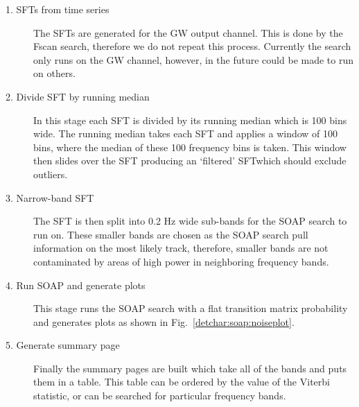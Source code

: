 \begin{description}
	\item[1. \glspl{SFT} from time series] The \glspl{SFT} are generated for the \gls{GW} output channel. This is done by the Fscan search, therefore we do not repeat this process. Currently the search only runs on the \gls{GW} channel, however, in the future could be made to run on others.
	
	\item[2. Divide \gls{SFT} by running median] In this stage each \gls{SFT} is divided by its running median which is 100 bins wide. The running median takes each \gls{SFT} and applies a window of 100 bins, where the median of these 100 frequency bins is taken. This window then slides over the \gls{SFT} producing an `filtered' \gls{SFT}which should exclude outliers.
	
	\item[3. Narrow-band \gls{SFT}] The \gls{SFT} is then split into 0.2 Hz wide sub-bands for the SOAP search to run on. These smaller bands are chosen as the SOAP search pull information on the most likely track, therefore, smaller bands are not contaminated by areas of high power in neighboring frequency bands. 
	
	\item[4. Run SOAP and generate plots] This stage runs the SOAP search with a flat transition matrix probability and generates plots as shown in Fig.~\ref{detchar:soap:noiseplot}.
	
	\item[5. Generate summary page] Finally the summary pages are built which take all of the bands and puts them in a table. This table can be ordered by the value of the Viterbi statistic, or can be searched for particular frequency bands. 
\end{description}

